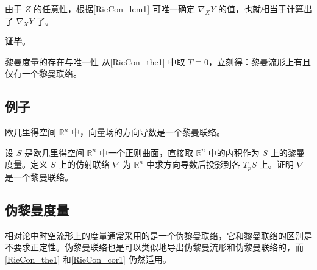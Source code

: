 由于 $Z$ 的任意性，根据\autoref{RieCon_lem1} 可唯一确定 $\nabla_XY$ 的值，也就相当于计算出了 $\nabla_XY$ 了。

\textbf{证毕}。

\begin{corollary}{黎曼度量的存在与唯一性}\label{RieCon_cor1}
从\autoref{RieCon_the1} 中取 $T\equiv 0$，立刻得：黎曼流形上有且仅有一个黎曼联络。
\end{corollary}

\subsection{例子}

\begin{example}{}
欧几里得空间 $\mathbb{R}^n$ 中，向量场的方向导数是一个黎曼联络。
\end{example}


\begin{exercise}{}
设 $S$ 是欧几里得空间 $\mathbb{R}^n$ 中一个正则曲面，直接取 $\mathbb{R}^n$ 中的内积作为 $S$ 上的黎曼度量。定义 $S$ 上的仿射联络 $\nabla$ 为 $\mathbb{R}^n$ 中求方向导数后投影到各 $T_pS$ 上。证明 $\nabla$ 是一个黎曼联络。
\end{exercise}

\subsection{伪黎曼度量}

相对论中时空流形上的度量通常采用的是一个伪黎曼联络，它和黎曼联络的区别是不要求正定性。伪黎曼联络也是可以类似地导出伪黎曼流形和伪黎曼联络的，而\autoref{RieCon_the1} 和\autoref{RieCon_cor1} 仍然适用。






